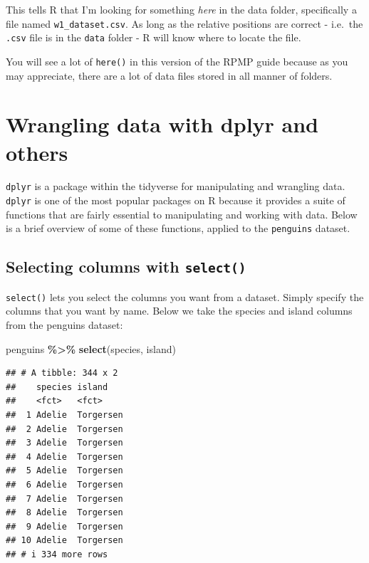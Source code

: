 \documentclass[
]{book}
\newenvironment{Shaded}{\begin{snugshade}}{\end{snugshade}}
\newcommand{\FunctionTok}[1]{\textcolor[rgb]{0.13,0.29,0.53}{\textbf{#1}}}
\newcommand{\NormalTok}[1]{#1}
\newcommand{\SpecialCharTok}[1]{\textcolor[rgb]{0.81,0.36,0.00}{\textbf{#1}}}
\begin{document}
This tells R that I'm looking for something \emph{here} in the data folder, specifically a file named \texttt{w1\_dataset.csv}. As long as the relative positions are correct - i.e.~the \texttt{.csv} file is in the \texttt{data} folder - R will know where to locate the file.

You will see a lot of \texttt{here()} in this version of the RPMP guide because as you may appreciate, there are a lot of data files stored in all manner of folders.

\hypertarget{wrangling-data-with-dplyr-and-others}{%
\section{Wrangling data with dplyr and others}\label{wrangling-data-with-dplyr-and-others}}

\texttt{dplyr} is a package within the tidyverse for manipulating and wrangling data. \texttt{dplyr} is one of the most popular packages on R because it provides a suite of functions that are fairly essential to manipulating and working with data. Below is a brief overview of some of these functions, applied to the \texttt{penguins} dataset.

\hypertarget{selecting-columns-with-select}{%
\subsection{\texorpdfstring{Selecting columns with \texttt{select()}}{Selecting columns with select()}}\label{selecting-columns-with-select}}

\texttt{select()} lets you select the columns you want from a dataset. Simply specify the columns that you want by name. Below we take the species and island columns from the penguins dataset:

\begin{Shaded}
\begin{Highlighting}[]
\NormalTok{penguins }\SpecialCharTok{\%\textgreater{}\%}
  \FunctionTok{select}\NormalTok{(species, island)}
\end{Highlighting}
\end{Shaded}

\begin{verbatim}
## # A tibble: 344 x 2
##    species island   
##    <fct>   <fct>    
##  1 Adelie  Torgersen
##  2 Adelie  Torgersen
##  3 Adelie  Torgersen
##  4 Adelie  Torgersen
##  5 Adelie  Torgersen
##  6 Adelie  Torgersen
##  7 Adelie  Torgersen
##  8 Adelie  Torgersen
##  9 Adelie  Torgersen
## 10 Adelie  Torgersen
## # i 334 more rows
\end{verbatim}
\end{document}
